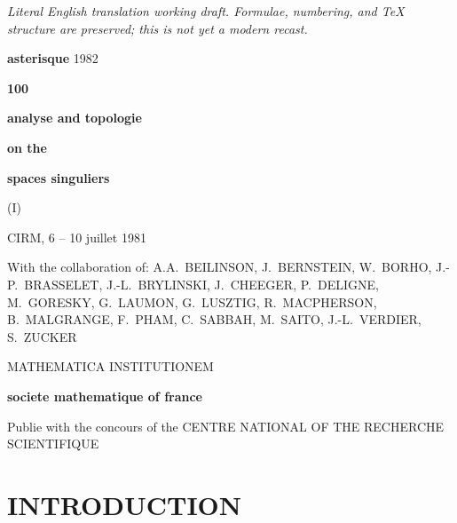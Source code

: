 \documentclass[12pt,a4paper]{article}
\theoremstyle{plain}
\theoremstyle{definition}
\theoremstyle{remark}
\begin{document}
\begin{center}\small\emph{Literal English translation working draft. Formulae, numbering, and TeX structure are preserved; this is not yet a modern recast.}\end{center}
\vspace{0.5em}


\thispagestyle{empty}
\begin{center}
\vspace*{1cm}
{\Large\textbf{asterisque}} \hfill {\Large 1982}

\textbf{100}

\vspace{2cm}
{\LARGE\textbf{analyse and topologie}}

\vspace{0.5cm}
{\Large\textbf{on the}}

\vspace{0.5cm}
{\LARGE\textbf{spaces singuliers}}

\vspace{0.5cm}
{\Large (I)}

\vspace{0.8cm}
{\normalsize CIRM, 6 -- 10 juillet 1981}

\vspace{1.5cm}
{\small With the collaboration of: A.A.~BEILINSON, J.~BERNSTEIN,
W.~BORHO, J.-P.~BRASSELET, J.-L.~BRYLINSKI, J.~CHEEGER,
P.~DELIGNE, M.~GORESKY, G.~LAUMON, G.~LUSZTIG,
R.~MACPHERSON, B.~MALGRANGE, F.~PHAM, C.~SABBAH,
M.~SAITO, J.-L.~VERDIER, S.~ZUCKER}

\vfill
{\small MATHEMATICA INSTITUTIONEM}

\vspace{0.5cm}
\textbf{societe mathematique of france}

\vspace{0.3cm}
{\footnotesize Publie with the concours of the CENTRE NATIONAL OF THE RECHERCHE SCIENTIFIQUE}
\end{center}
\newpage

\thispagestyle{empty}
\section*{INTRODUCTION}
\end{document}
